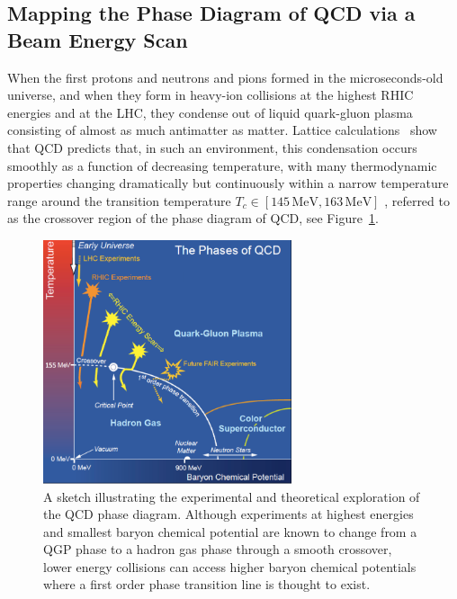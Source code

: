 \subsection{Mapping the Phase Diagram of QCD via a Beam Energy Scan}
\label{Sec:BES}




When the first protons and neutrons and pions formed in the
microseconds-old universe, and when they form in heavy-ion collisions
at the highest RHIC energies and at the LHC, they condense out of
liquid quark-gluon plasma consisting of almost as much antimatter as
matter. Lattice calculations~\cite{Aoki:2006we,Aoki:2009sc,Bazavov:2011nk} 
show that QCD predicts that, in such an environment, this condensation 
occurs smoothly as a function of decreasing temperature, with many 
thermodynamic properties changing dramatically but continuously within 
a narrow temperature range around the transition temperature 
$T_c\in [145\,\mathrm{MeV},163\,\mathrm{MeV}]$
\cite{Bazavov:2011nk,Bazavov:2014pvz}, referred to as the crossover
region of the phase diagram of QCD, see Figure~\ref{F-PD1}.
%
\begin{figure}[t]
\begin{center}
\centerline{\includegraphics[width=0.65\textwidth]{fig/Phasediagram.png}}
\caption[The QCD phase diagram]{A sketch illustrating the experimental and theoretical
  exploration of the QCD phase diagram. Although experiments at
  highest energies and smallest baryon chemical potential are known to
  change from a QGP phase to a hadron gas phase through a smooth
  crossover, lower energy collisions can access higher baryon chemical
  potentials where a first order phase transition line is thought to
  exist.}
\label{F-PD1}
\end{center}
\end{figure}
